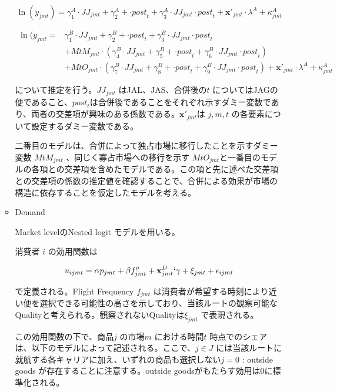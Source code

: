 \documentclass{jsarticle}
\begin{document}
\begin{enumerate}
\begin{itemize}
\[\ln(y_{jmt})=\gamma^A_1 \cdot \textit{JJ}_{jmt} + \gamma^A_2 + \cdot \textit{post}_t +\gamma_3^A \cdot \textit{JJ}_{jmt} \cdot \textit{post}_t + \mathbf{x}'_{jmt} \cdot \lambda^A +\kappa_{jmt}^A \]

\begin{align*}
\ln(y_{jmt}= &\gamma^B_1 \cdot \textit{JJ}_{jmt} + \gamma^B_2 + \cdot \textit{post}_t +\gamma_3^B \cdot \textit{JJ}_{jmt} \cdot \textit{post}_t \\
 & + \textit{MtM}_{jmt} \cdot (\gamma^B_4 \cdot \textit{JJ}_{jmt} + \gamma^B_5 + \cdot \textit{post}_t +\gamma_6^B \cdot \textit{JJ}_{jmt} \cdot \textit{post}_t ) \\
 & +\textit{MtO}_{jmt} \cdot (\gamma^B_7 \cdot \textit{JJ}_{jmt} + \gamma^B_8 + \cdot \textit{post}_t +\gamma_9^B \cdot \textit{JJ}_{jmt} \cdot \textit{post}_t) + \mathbf{x}'_{jmt} \cdot \lambda^A +\kappa_{jmt}^A 
 \end{align*}

について推定を行う。$\textit{JJ}_{jmt}$ はJAL、JAS、合併後の$t$ についてはJAGの便であること、$\textit{post}_t $は合併後であることをそれぞれ示すダミー変数であり、両者の交差項が興味のある係数である。$\mathbf{x}'_{jmt}$は $j, m, t$ の各要素について設定するダミー変数である。

二番目のモデルは、合併によって独占市場に移行したことを示すダミー変数 $\textit{MtM}_{jmt}$ 、同じく寡占市場への移行を示す $\textit{MtO}_{jmt}$と一番目のモデルの各項との交差項を含めたモデルである。この項と先に述べた交差項との交差項の係数の推定値を確認することで、合併による効果が市場の構造に依存することを仮定したモデルを考える。

\item Demand

Market levelのNested logit モデルを用いる。

消費者 $i$ の効用関数は

\[u_{ijmt} = \alpha p_{jmt} +\beta f_{jmt}^{\rho} +\mathbf{x}^{D}_{jmt} ` \gamma + \xi_{jmt} +\epsilon _{ijmt} \]

で定義される。Flight Frequency $f_{jmt}$ は消費者が希望する時刻により近い便を選択できる可能性の高さを示しており、当該ルートの観察可能なQualityと考えられる。観察されないQualityは$\xi_{jmt}$ で表現される。

この効用関数の下で、商品$j$ の市場$m$ における時間$t$ 時点でのシェアは、以下のモデルによって記述される。ここで、$j \in J$ には当該ルートに就航する各キャリアに加え、いずれの商品も選択しない$j=0 $ : outside goods が存在することに注意する。outside goodsがもたらす効用は0に標準化される。


\end{itemize}
\end{enumerate}
\end{document}
